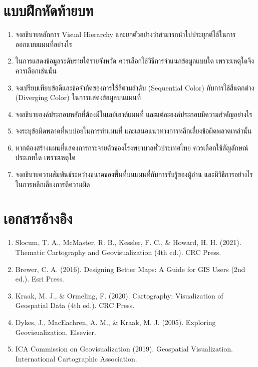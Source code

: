 \section{แบบฝึกหัดท้ายบท}
\begin{enumerate}
    \item จงอธิบายหลักการ Visual Hierarchy และยกตัวอย่างว่าสามารถนำไปประยุกต์ใช้ในการออกแบบแผนที่อย่างไร
    \item ในการแสดงข้อมูลระดับรายได้รายจังหวัด ควรเลือกใช้วิธีการจำแนกข้อมูลแบบใด เพราะเหตุใดจึงควรเลือกเช่นนั้น
    \item จงเปรียบเทียบข้อดีและข้อจำกัดของการใช้สีตามลำดับ (Sequential Color) กับการใช้สีแตกต่าง (Diverging Color) ในการแสดงข้อมูลบนแผนที่
    \item จงอธิบายองค์ประกอบหลักที่ต้องมีในเลย์เอาต์แผนที่ และแต่ละองค์ประกอบมีความสำคัญอย่างไร
    \item จงระบุข้อผิดพลาดที่พบบ่อยในการทำแผนที่ และเสนอแนวทางการหลีกเลี่ยงข้อผิดพลาดเหล่านั้น
    \item หากต้องสร้างแผนที่แสดงการกระจายตัวของโรงพยาบาลทั่วประเทศไทย ควรเลือกใช้สัญลักษณ์ประเภทใด เพราะเหตุใด
    \item จงอธิบายความสัมพันธ์ระหว่างขนาดของพื้นที่บนแผนที่กับการรับรู้ของผู้อ่าน และมีวิธีการอย่างไรในการหลีกเลี่ยงการตีความผิด
\end{enumerate}

\section{เอกสารอ้างอิง}
\begin{enumerate}
    \item Slocum, T. A., McMaster, R. B., Kessler, F. C., \& Howard, H. H. (2021). Thematic Cartography and Geovisualization (4th ed.). CRC Press.
    \item Brewer, C. A. (2016). Designing Better Maps: A Guide for GIS Users (2nd ed.). Esri Press.
    \item Kraak, M. J., \& Ormeling, F. (2020). Cartography: Visualization of Geospatial Data (4th ed.). CRC Press.
    \item Dykes, J., MacEachren, A. M., \& Kraak, M. J. (2005). Exploring Geovisualization. Elsevier.
    \item ICA Commission on Geovisualization (2019). Geospatial Visualization. International Cartographic Association.
\end{enumerate}
